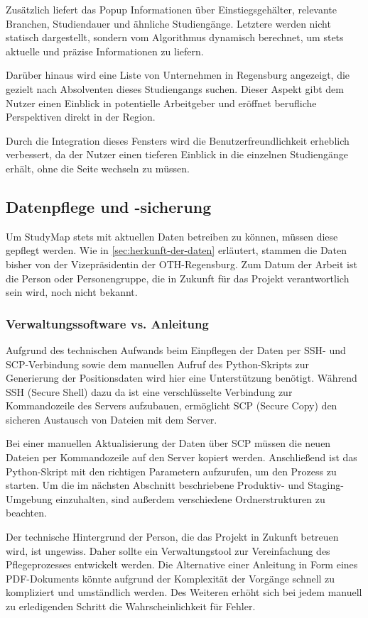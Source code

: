 Zusätzlich liefert das Popup Informationen über Einstiegsgehälter, relevante Branchen, Studiendauer und ähnliche Studiengänge. Letztere werden nicht statisch dargestellt, sondern vom Algorithmus dynamisch berechnet, um stets aktuelle und präzise Informationen zu liefern.

Darüber hinaus wird eine Liste von Unternehmen in Regensburg angezeigt, die gezielt nach Absolventen dieses Studiengangs suchen. Dieser Aspekt gibt dem Nutzer einen Einblick in potentielle Arbeitgeber und eröffnet berufliche Perspektiven direkt in der Region.

Durch die Integration dieses Fensters wird die Benutzerfreundlichkeit erheblich 
verbessert, da der Nutzer einen tieferen Einblick in die einzelnen Studiengänge
erhält, ohne die Seite wechseln zu müssen.

\subsection{Datenpflege und -sicherung}
Um StudyMap stets mit aktuellen Daten betreiben zu können, müssen diese gepflegt werden. Wie in \autoref{sec:herkunft-der-daten} erläutert, stammen die Daten bisher von der Vizepräsidentin der OTH-Regensburg. Zum Datum der Arbeit ist die Person oder Personengruppe, die in Zukunft für das Projekt verantwortlich sein wird, noch nicht bekannt.

\subsubsection{Verwaltungssoftware vs. Anleitung}\label{sec:verwaltungssoftware}
Aufgrund des technischen Aufwands beim Einpflegen der Daten per SSH- und SCP-Verbindung sowie dem manuellen Aufruf des Python-Skripts zur Generierung der Positionsdaten wird hier eine Unterstützung benötigt. Während SSH (Secure Shell) dazu da ist eine verschlüsselte Verbindung zur Kommandozeile des Servers aufzubauen, ermöglicht SCP (Secure Copy) den sicheren Austausch von Dateien mit dem Server.

Bei einer manuellen Aktualisierung der Daten über SCP müssen die neuen Dateien per Kommandozeile auf den Server kopiert werden. Anschließend ist das Python-Skript mit den richtigen Parametern aufzurufen, um den Prozess zu starten. Um die im nächsten Abschnitt beschriebene Produktiv- und Staging-Umgebung einzuhalten, sind außerdem verschiedene Ordnerstrukturen zu beachten.

Der technische Hintergrund der Person, die das Projekt in Zukunft betreuen wird, ist ungewiss. Daher sollte ein Verwaltungstool zur Vereinfachung des Pflegeprozesses entwickelt werden. Die Alternative einer Anleitung in Form eines PDF-Dokuments könnte aufgrund der Komplexität der Vorgänge schnell zu kompliziert und umständlich werden. Des Weiteren erhöht sich bei jedem manuell zu erledigenden Schritt die Wahrscheinlichkeit für Fehler.

